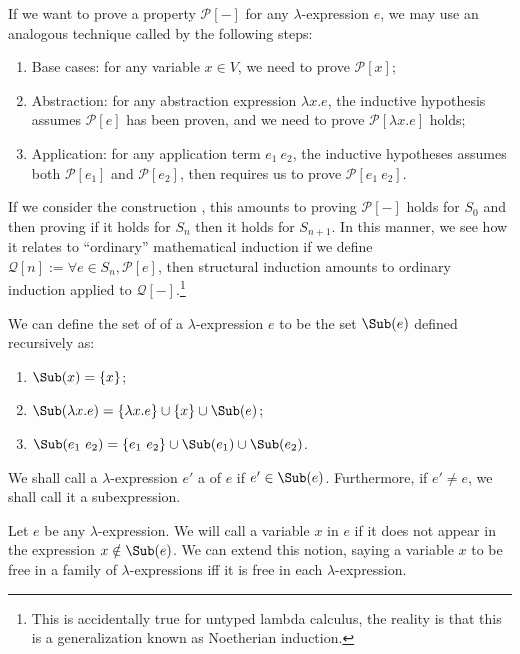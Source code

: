 \begin{node}[Syntax]
\begin{node}
If we want to prove a property $\mathcal{P}[-]$ for any
$\lambda$-expression $e$, we may use an analogous technique called
 by the following steps:
\begin{enumerate}
\item Base cases: for any variable $x\in V$, we need to prove $\mathcal{P}[x]$;
\item Abstraction: for any abstraction expression $\lambda x.e$, the
  inductive hypothesis assumes $\mathcal{P}[e]$ has been proven, and we
  need to prove $\mathcal{P}[\lambda x.e]$ holds;
\item Application: for any application term $e_{1}~e_{2}$, the inductive
  hypotheses assumes both $\mathcal{P}[e_{1}]$ and $\mathcal{P}[e_{2}]$,
  then requires us to prove $\mathcal{P}[e_{1}~e_{2}]$.
\end{enumerate}
If we consider the construction , this amounts
to proving $\mathcal{P}[-]$ holds for $S_{0}$ and then proving if it
holds for $S_{n}$ then it holds for $S_{n+1}$. In this manner, we see
how it relates to ``ordinary'' mathematical induction if we define
$\mathcal{Q}[n]:=\forall e\in S_{n},\mathcal{P}[e]$, then structural
induction amounts to ordinary induction applied to
$\mathcal{Q}[-]$.\footnote{This is accidentally true for untyped lambda
calculus, the reality is that this is a generalization known as Noetherian induction.}
\end{node}

\begin{definition}\label{untyped-lambda-0008}%
We can define the set of  of a $\lambda$-expression
$e$ to be the set $\Sub(e)$ defined recursively as:
\begin{enumerate}
\item $\Sub(x)=\{x\}$;
\item $\Sub(\lambda x.e)=\{\lambda x.e\}\cup\{x\}\cup\Sub(e)$;
\item $\Sub(e_{1}~e_{2})=\{e_{1}~e_{2}\}\cup\Sub(e_{1})\cup\Sub(e_{2})$.
\end{enumerate}
We shall call a $\lambda$-expression $e'$ a  of
$e$ if $e'\in\Sub(e)$. Furthermore, if $e'\neq e$, we shall call it a
 subexpression.
\end{definition}

\begin{definition}\label{untyped-lambda-000F}%
Let $e$ be any $\lambda$-expression. We will call a variable $x$
 in $e$ if it does not appear in the expression $x\notin\Sub(e)$.
We can extend this notion, saying a variable $x$ to be free in a
family of $\lambda$-expressions iff it is free in each $\lambda$-expression.


\end{definition}
\end{node}

